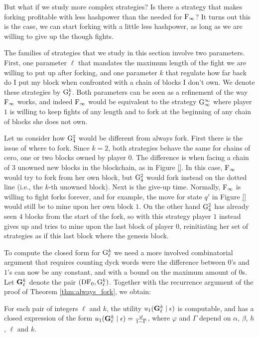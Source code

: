 But what if we study more complex strategies? Is there a strategy that makes forking profitable with less hashpower than the needed for ${\rm {F_\infty}}$? 
It turns out this is the case, we can start forking with a little less hashpower, as long as we are willing to give up the though fights. 

The families of strategies that we study in this section involve two parameters. First, one parameter $\ell$ that mandates the maximum length of the fight we are willing to put up 
after forking, and one parameter $k$ that regulate how far back do I put my block when confronted with a chain of blocks I don't own. We denote these strategies by 
${\rm {G}}_\ell^k$. Both parameters can be seen as a refinement of the way ${\rm {F_\infty}}$ works, and indeed ${\rm {F_\infty}}$ would be equivalent to the strategy ${\rm {G}}_\infty^\infty$ where 
player $1$ is willing to keep fights of any length and to fork at the beginning of any chain of blocks she does not own.  

\begin{example}
Let us consider how ${\rm {G}}_4^2$ would be different from always fork. First there is the issue of where to fork. Since $k = 2$, both strategies behave the same 
for chains of cero, one or two blocks owned by player $0$. The difference is when facing a chain of 3 unowned new blocks in the blockchain, as in Figure \ref{}. 
In this case, ${\rm {F_\infty}}$ would try to fork from her own block, but ${\rm {G}}_4^2$ would fork instead on the dotted line (i.e., the $k$-th unowned block).
Next is the give-up time. Normally, ${\rm {F_\infty}}$ is willing to fight forks forever, and for example, the move for state $q'$ in Figure \ref{} would still be to mine upon 
her own block $1$. On the other hand ${\rm {G}}_4^2$ has already seen $4$ blocks from the start of the fork, so with this strategy player $1$ instead gives up and 
tries to mine upon the last block of player $0$, reinitiating her set of strategies as if this last block where the genesis block. 
\end{example}

To compute the closed form for ${\rm {G}}_\ell^k$ we need a more involved combinatorial argument that requires counting dyck words were the difference between $0$'s and $1$'s can now be any constant, and with a bound on the maximum amount of $0$s. Let ${\rm {\bf G}}^k_\ell$ denote the pair $(\text{\rm DF}_0,{\rm {G}}_\ell^k)$. Together with the recurrence argument of the proof of Theorem \ref{thm:always_fork}, we obtain: 

\begin{theorem}
For each pair of integers $\ell$ and $k$, the utility $u_1({\rm {\bf G}}^k_\ell \mid \epsilon)$ is computable, and has a closed expression of the form $u_1({\rm {\bf G}}^k_\ell \mid \epsilon) = \frac{\varphi}{1-\Gamma}$, where $\varphi$ and $\Gamma$ depend on $\alpha$, $\beta$, $h$, $\ell$ and $k$. 
\end{theorem}

